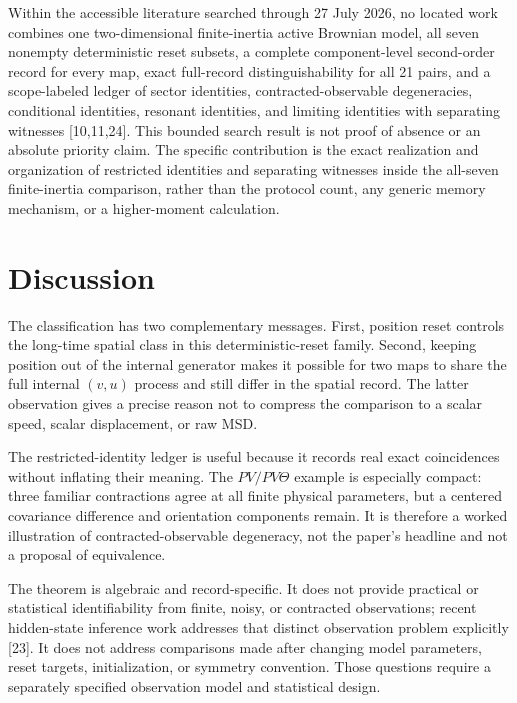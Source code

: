 Within the accessible literature searched through 27 July 2026, no located work combines one two-dimensional finite-inertia active Brownian model, all seven nonempty deterministic reset subsets, a complete component-level second-order record for every map, exact full-record distinguishability for all 21 pairs, and a scope-labeled ledger of sector identities, contracted-observable degeneracies, conditional identities, resonant identities, and limiting identities with separating witnesses {[}10,11,24{]}. This bounded search result is not proof of absence or an absolute priority claim. The specific contribution is the exact realization and organization of restricted identities and separating witnesses inside the all-seven finite-inertia comparison, rather than the protocol count, any generic memory mechanism, or a higher-moment calculation.

\section{Discussion}\label{discussion}

The classification has two complementary messages. First, position reset controls the long-time spatial class in this deterministic-reset family. Second, keeping position out of the internal generator makes it possible for two maps to share the full internal \((v,u)\) process and still differ in the spatial record. The latter observation gives a precise reason not to compress the comparison to a scalar speed, scalar displacement, or raw MSD.

The restricted-identity ledger is useful because it records real exact coincidences without inflating their meaning. The \(PV/PV\Theta\) example is especially compact: three familiar contractions agree at all finite physical parameters, but a centered covariance difference and orientation components remain. It is therefore a worked illustration of contracted-observable degeneracy, not the paper's headline and not a proposal of equivalence.

The theorem is algebraic and record-specific. It does not provide practical or statistical identifiability from finite, noisy, or contracted observations; recent hidden-state inference work addresses that distinct observation problem explicitly {[}23{]}. It does not address comparisons made after changing model parameters, reset targets, initialization, or symmetry convention. Those questions require a separately specified observation model and statistical design.

